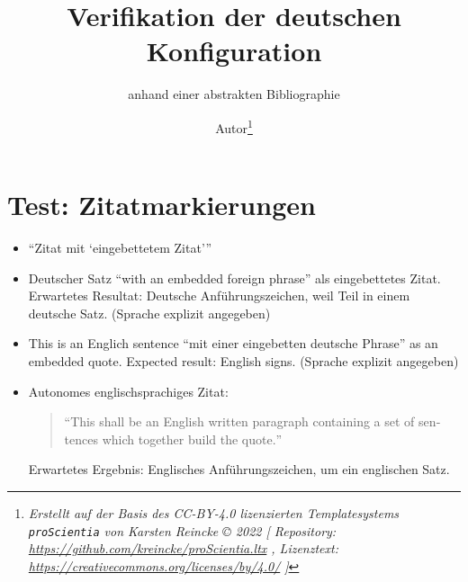 \documentclass[
  DIV=calc,i
  BCOR=5mm,
  11pt,
  headings=small,
  oneside,
  abstract=true,
  toc=bib,
  english,ngerman]{scrartcl}
\begin{document}
\nocite{*}

\titlehead{Bib\LaTeX}
\subject{Release 1.0}
\title{Verifikation der deutschen Konfiguration}
\subtitle{anhand einer abstrakten Bibliographie}
\author{Autor\footnote{
\textit{Erstellt auf der Basis des CC-BY-4.0 lizenzierten Templatesystems \texttt{proScientia} von Karsten Reincke \copyright{} 2022 [
Repository: \href{https://github.com/kreincke/proScientia.ltx}{https://github.com/kreincke/proScientia.ltx} ,
Lizenztext: \href{https://creativecommons.org/licenses/by/4.0/}{https://creativecommons.org/licenses/by/4.0/} ]}}
}


\maketitle

\footnotesize
\tableofcontents

\normalsize
\section{Test: Zitatmarkierungen}
\begin{itemize}

  \item \enquote{Zitat mit \enquote{eingebettetem Zitat}}

  \item Deutscher Satz \foreignquote{german}{with an embedded foreign phrase} als eingebettetes Zitat. Erwartetes Resultat: Deutsche Anführungszeichen, weil Teil in einem deutsche Satz. (Sprache explizit angegeben)

  \item This is an Englich sentence \foreignquote{english}{mit einer eingebetten deutsche Phrase} as an embedded quote. Expected result: English signs. (Sprache explizit angegeben)

  \item Autonomes englischsprachiges Zitat:
  \begin{quote}\foreignquote{english}{This shall be an English written paragraph containing a set of sentences which together build the quote.}\end{quote}

  Erwartetes Ergebnis: Englisches Anführungszeichen, um ein englischen Satz.
\end{itemize}
\end{document}
